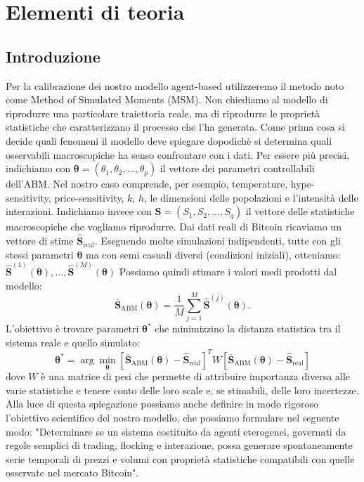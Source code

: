 \section{Elementi di teoria}
\subsection{Introduzione}
Per la calibrazione dei nostro modello agent-based utilizzeremo il metodo noto come Method of Simulated Moments (MSM).
Non chiediamo al modello di riprodurre una particolare traiettoria reale, ma di riprodurre le proprietà statistiche che caratterizzano il 
processo che l'ha generata. Come prima cosa si decide quali fenomeni il modello deve spiegare dopodichè si determina quali osservabili 
macroscopiche ha senso confrontare con i dati. Per essere più precisi, indichiamo con $\boldsymbol{\theta} =(\theta_1,\theta_2,\ldots,\theta_p)$
il vettore dei parametri controllabili dell'ABM. Nel nostro caso comprende, per esempio, temperature, hype-sensitivity, price-sensitivity, \(k\), \(h\),
le dimensioni delle popolazioni e l'intensità delle interazioni.
Indichiamo invece con $\mathbf{S} =(S_1,S_2,\ldots,S_q)$ il vettore delle statistiche macroscopiche che vogliamo riprodurre.
Dai dati reali di Bitcoin ricaviamo un vettore di stime $\widehat{\mathbf{S}}_{\mathrm{real}}$.
Eseguendo molte simulazioni indipendenti, tutte con gli stessi parametri \(\boldsymbol{\theta}\) ma con semi casuali diversi (condizioni iniziali), otteniamo:
$\widehat{\mathbf{S}}^{(1)}(\boldsymbol{\theta}),\ldots,\widehat{\mathbf{S}}^{(M)}(\boldsymbol{\theta})$
Possiamo quindi stimare i valori medi prodotti dal modello:
\[
\overline{\mathbf{S}}_{\mathrm{ABM}}(\boldsymbol{\theta})
=
\frac{1}{M}
\sum_{j=1}^{M}
\widehat{\mathbf{S}}^{(j)}(\boldsymbol{\theta}).
\]
L'obiettivo è trovare parametri \(\boldsymbol{\theta}^*\) che minimizzino la distanza statistica tra il sistema reale e quello simulato:
\[
\boldsymbol{\theta}^{*}
=
\arg\min_{\boldsymbol{\theta}}
\left[
\overline{\mathbf{S}}_{\mathrm{ABM}}(\boldsymbol{\theta})
-
\widehat{\mathbf{S}}_{\mathrm{real}}
\right]^{T}
W
\left[
\overline{\mathbf{S}}_{\mathrm{ABM}}(\boldsymbol{\theta})
-
\widehat{\mathbf{S}}_{\mathrm{real}}
\right]
\]
dove \(W\) è una matrice di pesi che permette di attribuire importanza diversa alle varie statistiche e tenere conto delle loro scale e, se stimabili, 
delle loro incertezze. Alla luce di questa spiegazione possiamo anche definire in modo rigoroso l'obiettivo scientifico del nostro modello, che possiamo
formulare nel seguente modo: "Determinare se un sistema costituito da agenti eterogenei, governati da regole semplici di trading, flocking e interazione, 
possa generare spontaneamente serie temporali di prezzi e volumi con proprietà statistiche compatibili con quelle osservate nel mercato Bitcoin".

